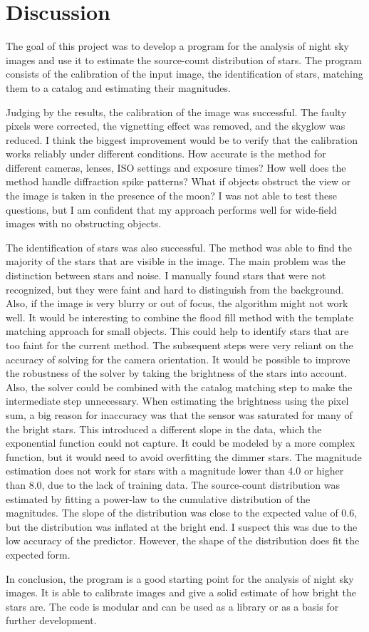 
\section{Discussion}
\label{sec:discussion}

The goal of this project was to develop a program for the analysis of night sky images
and use it to estimate the source-count distribution of stars. The program consists of
the calibration of the input image, the identification of stars, matching them to a
catalog and estimating their magnitudes.

Judging by the results, the calibration of the image was successful. The faulty pixels
were corrected, the vignetting effect was removed, and the skyglow was reduced. I think
the biggest improvement would be to verify that the calibration works reliably under
different conditions. How accurate is the method for different cameras, lenses, ISO
settings and exposure times? How well does the method handle diffraction spike patterns?
What if objects obstruct the view or the image is taken in the presence of the moon? I was
not able to test these questions, but I am confident that my approach performs well for
wide-field images with no obstructing objects.

The identification of stars was also successful. The method was able to find the majority
of the stars that are visible in the image. The main problem was the distinction between
stars and noise. I manually found stars that were not recognized, but they were faint and
hard to distinguish from the background. Also, if the image is very blurry or out of
focus, the algorithm might not work well. It would be interesting to combine the flood
fill method with the template matching approach for small objects. This could help to
identify stars that are too faint for the current method. The subsequent steps were very
reliant on the accuracy of solving for the camera orientation. It would be possible to
improve the robustness of the solver by taking the brightness of the stars into account.
Also, the solver could be combined with the catalog matching step to make the intermediate
step unnecessary. When estimating the brightness using the pixel sum, a big reason for
inaccuracy was that the sensor was saturated for many of the bright stars. This introduced
a different slope in the data, which the exponential function could not capture. It could
be modeled by a more complex function, but it would need to avoid overfitting the dimmer
stars. The magnitude estimation does not work for stars with a magnitude lower than 4.0 or
higher than 8.0, due to the lack of training data. The source-count distribution was
estimated by fitting a power-law to the cumulative distribution of the magnitudes. The
slope of the distribution was close to the expected value of $0.6$, but the distribution
was inflated at the bright end. I suspect this was due to the low accuracy of the
predictor. However, the shape of the distribution does fit the expected form.

In conclusion, the program is a good starting point for the analysis of night sky images.
It is able to calibrate images and give a solid estimate of how bright the stars are. The
code is modular and can be used as a library or as a basis for further development.

